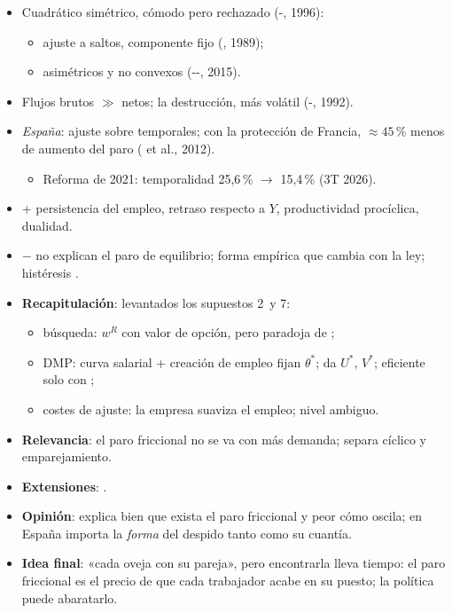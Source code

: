 \documentclass{article}
\begin{document}
\begin{columnas}
\begin{itemize}
\item Cuadrático simétrico, cómodo pero rechazado (-, 1996):
  \begin{itemize}
  \item ajuste a saltos, componente fijo (, 1989);
  \item asimétricos y no convexos (--, 2015).
  \end{itemize}
\item Flujos brutos $\gg$ netos; la destrucción, más volátil (-, 1992).
\item \emph{España}: ajuste sobre temporales; con la protección de Francia, $\approx45$\,\% menos de aumento del paro ( et al., 2012).
  \begin{itemize}
  \item Reforma de 2021: temporalidad 25,6\,\% $\to$ 15,4\,\% (3T 2026).
  \end{itemize}
\end{itemize}

\begin{itemize}
\item + persistencia del empleo, retraso respecto a $Y$, productividad procíclica, dualidad.
\item $-$ no explican el paro de equilibrio; forma empírica que cambia con la ley; histéresis .
\end{itemize}

\begin{itemize}
\item \textbf{Recapitulación}: levantados los supuestos 2~y 7:
  \begin{itemize}
  \item búsqueda: $w^R$ con valor de opción, pero paradoja de ;
  \item DMP: curva salarial + creación de empleo fijan $\theta^*$;  da $U^*$, $V^*$; eficiente solo con ;
  \item costes de ajuste: la empresa suaviza el empleo; nivel ambiguo.
  \end{itemize}
\item \textbf{Relevancia}: el paro friccional no se va con más demanda;  separa cíclico y emparejamiento.
\item \textbf{Extensiones}:      .
\item \textbf{Opinión}: explica bien que exista el paro friccional y peor cómo oscila; en España importa la \emph{forma} del despido tanto como su cuantía.
\item \textbf{Idea final}: «cada oveja con su pareja», pero encontrarla lleva tiempo: el paro friccional es el precio de que cada trabajador acabe en su puesto; la política puede abaratarlo.
\end{itemize}


\end{columnas}
\end{document}
